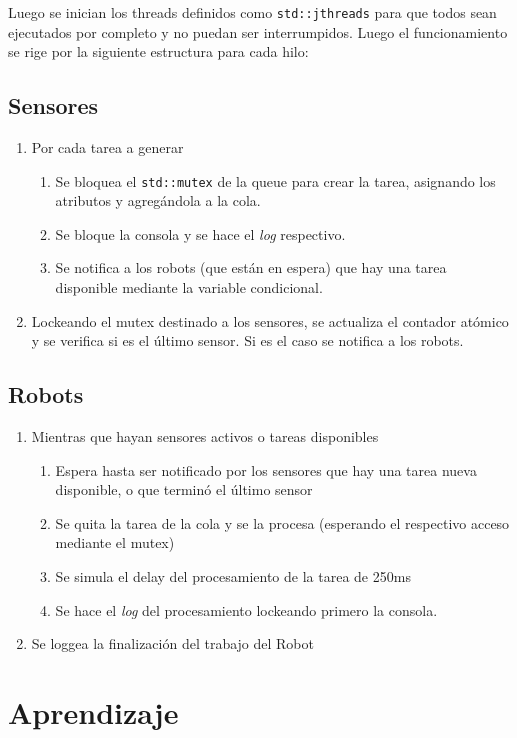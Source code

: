 \documentclass[11pt, a4paper]{article}
\begin{document}
\begin{multicols}{2}
Luego se inician los threads definidos como \lstinline|std::jthreads| para que todos sean
ejecutados por completo y no puedan ser interrumpidos. Luego el funcionamiento se rige por 
la siguiente estructura para cada hilo:

\subsection{Sensores}
\begin{enumerate}[label=\Roman*.]
    \item Por cada tarea a generar 
    \begin{enumerate}[label=\roman*.]
        \item Se bloquea el \lstinline|std::mutex| de la queue para crear la tarea,
        asignando los atributos y agregándola a la cola.
        \item Se bloque la consola y se hace el \textit{log} respectivo.
        \item Se notifica a los robots (que están en espera) que hay una tarea disponible
        mediante la variable condicional.
    \end{enumerate}
    \item Lockeando el mutex destinado a los sensores, se actualiza el contador atómico y se 
    verifica si es el último sensor. Si es el caso se notifica a los robots.
\end{enumerate}

\subsection{Robots}
\begin{enumerate}[label=\Roman*.]
    \item Mientras que hayan sensores activos o tareas disponibles
    \begin{enumerate}[label=\roman*.]
        \item Espera hasta ser notificado por los sensores que hay una tarea nueva disponible,
        o que terminó el último sensor
        \item Se quita la tarea de la cola y se la procesa (esperando el respectivo acceso mediante
        el mutex)
        \item Se simula el delay del procesamiento de la tarea de 250ms
        \item Se hace el \textit{log} del procesamiento lockeando primero la consola.
    \end{enumerate}
    \item Se loggea la finalización del trabajo del Robot
\end{enumerate}
\section*{Aprendizaje}
\end{multicols}
\end{document}

